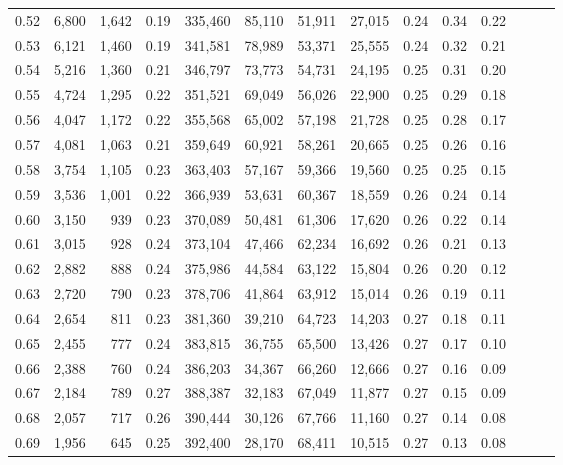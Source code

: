 \begin{tabular}{rrrrrrrrrrrrrr}
0.52 &   6,800 &  1,642 &  0.19 &  335,460 &   85,110 &  51,911 &  27,015 &  0.24 &  0.34 &      0.22 \\
0.53 &   6,121 &  1,460 &  0.19 &  341,581 &   78,989 &  53,371 &  25,555 &  0.24 &  0.32 &      0.21 \\
0.54 &   5,216 &  1,360 &  0.21 &  346,797 &   73,773 &  54,731 &  24,195 &  0.25 &  0.31 &      0.20 \\
0.55 &   4,724 &  1,295 &  0.22 &  351,521 &   69,049 &  56,026 &  22,900 &  0.25 &  0.29 &      0.18 \\
0.56 &   4,047 &  1,172 &  0.22 &  355,568 &   65,002 &  57,198 &  21,728 &  0.25 &  0.28 &      0.17 \\
0.57 &   4,081 &  1,063 &  0.21 &  359,649 &   60,921 &  58,261 &  20,665 &  0.25 &  0.26 &      0.16 \\
0.58 &   3,754 &  1,105 &  0.23 &  363,403 &   57,167 &  59,366 &  19,560 &  0.25 &  0.25 &      0.15 \\
0.59 &   3,536 &  1,001 &  0.22 &  366,939 &   53,631 &  60,367 &  18,559 &  0.26 &  0.24 &      0.14 \\
0.60 &   3,150 &    939 &  0.23 &  370,089 &   50,481 &  61,306 &  17,620 &  0.26 &  0.22 &      0.14 \\
0.61 &   3,015 &    928 &  0.24 &  373,104 &   47,466 &  62,234 &  16,692 &  0.26 &  0.21 &      0.13 \\
0.62 &   2,882 &    888 &  0.24 &  375,986 &   44,584 &  63,122 &  15,804 &  0.26 &  0.20 &      0.12 \\
0.63 &   2,720 &    790 &  0.23 &  378,706 &   41,864 &  63,912 &  15,014 &  0.26 &  0.19 &      0.11 \\
0.64 &   2,654 &    811 &  0.23 &  381,360 &   39,210 &  64,723 &  14,203 &  0.27 &  0.18 &      0.11 \\
0.65 &   2,455 &    777 &  0.24 &  383,815 &   36,755 &  65,500 &  13,426 &  0.27 &  0.17 &      0.10 \\
0.66 &   2,388 &    760 &  0.24 &  386,203 &   34,367 &  66,260 &  12,666 &  0.27 &  0.16 &      0.09 \\
0.67 &   2,184 &    789 &  0.27 &  388,387 &   32,183 &  67,049 &  11,877 &  0.27 &  0.15 &      0.09 \\
0.68 &   2,057 &    717 &  0.26 &  390,444 &   30,126 &  67,766 &  11,160 &  0.27 &  0.14 &      0.08 \\
0.69 &   1,956 &    645 &  0.25 &  392,400 &   28,170 &  68,411 &  10,515 &  0.27 &  0.13 &      0.08 \\

\end{tabular}
